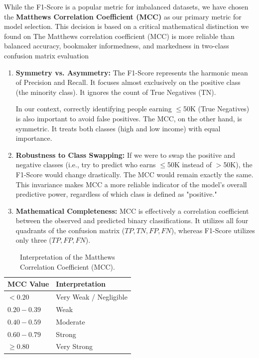 While the F1-Score is a popular metric for imbalanced datasets, we have chosen the \textbf{Matthews Correlation Coefficient (MCC)} as our primary metric for model selection. This decision is based on a critical mathematical distinction we found on
The Matthews correlation coefficient
(MCC) is more reliable than balanced
accuracy, bookmaker informedness, and
markedness in two-class confusion matrix
evaluation%
\begin{enumerate}
    \item \textbf{Symmetry vs. Asymmetry:} 
    The F1-Score represents the harmonic mean of Precision and Recall. It focuses almost exclusively on the positive class (the minority class). It ignores the count of True Negatives (TN). 
    
    In our context, correctly identifying people earning $\le$50K (True Negatives) is also important to avoid false positives. The MCC, on the other hand, is symmetric. It treats both classes (high and low income) with equal importance.
    
    \item \textbf{Robustness to Class Swapping:} 
    If we were to swap the positive and negative classes (i.e., try to predict who earns $\le$50K instead of $>$50K), the F1-Score would change drastically. The MCC would remain exactly the same. This invariance makes MCC a more reliable indicator of the model's overall predictive power, regardless of which class is defined as "positive."
    
    \item \textbf{Mathematical Completeness:} 
    MCC is effectively a correlation coefficient between the observed and predicted binary classifications. It utilizes all four quadrants of the confusion matrix ($TP, TN, FP, FN$), whereas F1-Score utilizes only three ($TP, FP, FN$).
\end{enumerate}

\begin{table}[h]
    \centering
    \begin{tabular}{ll}
        \toprule
        \textbf{MCC Value} & \textbf{Interpretation} \\
        \midrule
        $< 0.20$      & Very Weak / Negligible \\
        $0.20 - 0.39$ & Weak \\
        $0.40 - 0.59$ & Moderate \\
        $0.60 - 0.79$ & Strong \\
        $\ge 0.80$    & Very Strong \\
        \bottomrule
    \end{tabular}
    \label{tab:mcc_interpretation}
    \caption{Interpretation of the Matthews Correlation Coefficient (MCC).}
\end{table}


